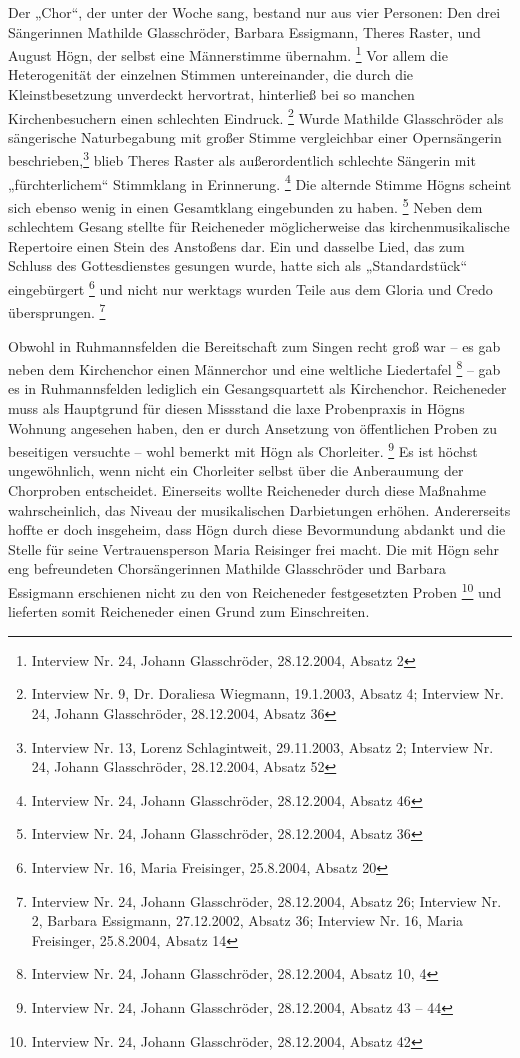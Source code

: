 Der „Chor“, der unter der Woche sang, bestand nur aus vier Personen: Den
drei Sängerinnen Mathilde Glasschröder, Barbara Essigmann, Theres
Raster, und August Högn, der selbst eine Männerstimme
übernahm. \footnote{Interview Nr. 24, Johann Glasschröder, 28.12.2004,
Absatz 2} Vor allem die Heterogenität der einzelnen Stimmen
untereinander, die durch die Kleinstbesetzung unverdeckt hervortrat,
hinterließ bei so manchen Kirchenbesuchern einen schlechten
Eindruck. \footnote{Interview Nr. 9, Dr. Doraliesa Wiegmann, 19.1.2003,
Absatz 4; Interview Nr. 24, Johann Glasschröder, 28.12.2004, Absatz 36}
Wurde Mathilde Glasschröder als sängerische Naturbegabung mit großer
Stimme vergleichbar einer Opernsängerin beschrieben,\footnote{
Interview Nr. 13, Lorenz Schlagintweit, 29.11.2003, Absatz 2; Interview
Nr. 24, Johann Glasschröder, 28.12.2004, Absatz 52} blieb Theres Raster
als außerordentlich schlechte Sängerin mit „fürchterlichem“ Stimmklang
in Erinnerung. \footnote{Interview Nr. 24, Johann Glasschröder,
28.12.2004, Absatz 46} Die alternde Stimme Högns scheint sich ebenso
wenig in einen Gesamtklang eingebunden zu haben. \footnote{Interview
Nr. 24, Johann Glasschröder, 28.12.2004, Absatz 36} Neben dem
schlechtem Gesang stellte für Reicheneder möglicherweise das
kirchenmusikalische Repertoire einen Stein des Anstoßens dar. Ein und
dasselbe Lied, das zum Schluss des Gottesdienstes gesungen wurde, hatte
sich als „Standardstück“ eingebürgert \footnote{Interview Nr. 16, Maria
Freisinger, 25.8.2004, Absatz 20} und nicht nur werktags wurden Teile
aus dem Gloria und Credo übersprungen. \footnote{Interview Nr. 24,
Johann Glasschröder, 28.12.2004, Absatz 26; Interview Nr. 2, Barbara
Essigmann, 27.12.2002, Absatz 36; Interview Nr. 16, Maria Freisinger,
25.8.2004, Absatz 14}

Obwohl in Ruhmannsfelden die Bereitschaft zum Singen recht groß war – es
gab neben dem Kirchenchor einen Männerchor und eine weltliche
Liedertafel \footnote{Interview Nr. 24, Johann Glasschröder,
28.12.2004, Absatz 10, 4 } – gab es in Ruhmannsfelden lediglich ein
Gesangsquartett als Kirchenchor. Reicheneder muss als Hauptgrund für
diesen Missstand die laxe Probenpraxis in Högns Wohnung angesehen
haben, den er durch Ansetzung von öffentlichen Proben zu beseitigen
versuchte – wohl bemerkt mit Högn als Chorleiter. \footnote{Interview
Nr. 24, Johann Glasschröder, 28.12.2004, Absatz 43 – 44} Es ist höchst
ungewöhnlich, wenn nicht ein Chorleiter selbst über die Anberaumung der
Chorproben entscheidet. Einerseits wollte Reicheneder durch diese
Maßnahme wahrscheinlich, das Niveau der musikalischen Darbietungen
erhöhen. Andererseits hoffte er doch insgeheim, dass Högn durch diese
Bevormundung abdankt und die Stelle für seine Vertrauensperson Maria
Reisinger frei macht. Die mit Högn sehr eng befreundeten
Chorsängerinnen Mathilde Glasschröder und Barbara Essigmann erschienen
nicht zu den von Reicheneder festgesetzten Proben \footnote{Interview
Nr. 24, Johann Glasschröder, 28.12.2004, Absatz 42} und lieferten somit
Reicheneder einen Grund zum Einschreiten.

